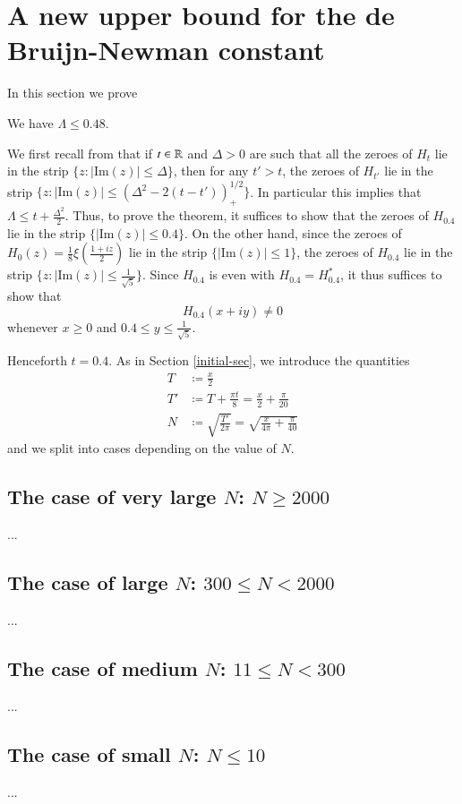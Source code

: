\section{A new upper bound for the de Bruijn-Newman constant}

In this section we prove

\begin{theorem}  We have $\Lambda \leq 0.48$.
\end{theorem}

We first recall from \cite[Theorem 13]{debr} that if $t \in \mathbb{R}$ and $\Delta>0$ are such that all the zeroes of $H_t$ lie in the strip $\{ z: |\mathrm{Im}(z)| \leq \Delta \}$, then for any $t' > t$, the zeroes of $H_{t'}$ lie in the strip $\{ z: |\mathrm{Im}(z)| \leq (\Delta^2 - 2(t-t'))_+^{1/2} \}$. In particular this implies that $\Lambda \leq t + \frac{\Delta^2}{2}$.  Thus, to prove the theorem, it suffices to show that the zeroes of $H_{0.4}$ lie in the strip $\{ |\mathrm{Im}(z)| \leq 0.4 \}$.  On the other hand, since the zeroes of $H_0(z) = \frac{1}{8} \xi\left(\frac{1+iz}{2}\right)$ lie in the strip $\{ |\mathrm{Im}(z)| \leq 1 \}$, the zeroes of $H_{0.4}$ lie in the strip $\{ z: |\mathrm{Im}(z)| \leq \frac{1}{\sqrt{5}}\}$.  Since $H_{0.4}$ is even with $H_{0.4} = H_{0.4}^*$, it thus suffices to show that
$$ H_{0.4}(x+iy) \neq 0$$
whenever $x \geq 0$ and $0.4 \leq y \leq \frac{1}{\sqrt{5}}$.

Henceforth $t=0.4$.  As in Section \ref{initial-sec}, we introduce the quantities
\begin{align*}
T &\coloneqq \frac{x}{2}\\
T' &\coloneqq T + \frac{\pi t}{8} = \frac{x}{2} + \frac{\pi}{20} \\
N &\coloneqq \sqrt{\frac{T'}{2\pi}} = \sqrt{\frac{x}{4\pi} + \frac{\pi}{40}}
\end{align*}
and we split into cases depending on the value of $N$.


\subsection{The case of very large $N$: $N \geq 2000$}

...

\subsection{The case of large $N$: $300 \leq N < 2000$}

...

\subsection{The case of medium $N$: $11 \leq N < 300$}

...

\subsection{The case of small $N$: $N \leq 10$}

...


